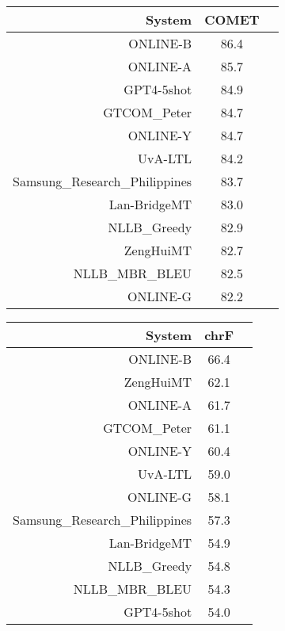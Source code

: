 \documentclass[11pt]{article}
\begin{document}
\begin{table}  
\scriptsize
\begin{subtable}[t]{0.33\textwidth}
\begin{tabular}{rcc}
\toprule 
System  & COMET \\ 
\midrule 
\rowcolor{ashgrey} ONLINE-B  & 86.4 \\ 
\rowcolor{ashgrey} ONLINE-A  & 85.7 \\ 
\rowcolor{ashgrey} GPT4-5shot  & 84.9 \\ 
\rowcolor{ashgrey} GTCOM\_Peter  & 84.7 \\ 
\rowcolor{ashgrey} ONLINE-Y  & 84.7 \\ 
UvA-LTL  & 84.2 \\ 
Samsung\_Research\_Philippines  & 83.7 \\ 
\rowcolor{ashgrey} Lan-BridgeMT  & 83.0 \\ 
\rowcolor{ashgrey} NLLB\_Greedy  & 82.9 \\ 
\rowcolor{ashgrey} ZengHuiMT & 82.7 \\ 
\rowcolor{ashgrey} NLLB\_MBR\_BLEU  & 82.5 \\ 
\rowcolor{ashgrey} ONLINE-G  & 82.2 \\ 
\bottomrule 
\end{tabular} 
\end{subtable} 
\begin{subtable}[t]{0.33\textwidth}
\begin{tabular}{rcc}
\toprule 
System  & chrF \\ 
\midrule 
\rowcolor{ashgrey} ONLINE-B  & 66.4 \\ 
\rowcolor{ashgrey} ZengHuiMT  & 62.1 \\ 
\rowcolor{ashgrey} ONLINE-A  & 61.7 \\ 
\rowcolor{ashgrey} GTCOM\_Peter  & 61.1 \\ 
\rowcolor{ashgrey} ONLINE-Y  & 60.4 \\ 
UvA-LTL  & 59.0 \\ 
\rowcolor{ashgrey} ONLINE-G  & 58.1 \\ 
Samsung\_Research\_Philippines  & 57.3 \\ 
\rowcolor{ashgrey} Lan-BridgeMT  & 54.9 \\ 
\rowcolor{ashgrey} NLLB\_Greedy  & 54.8 \\ 
\rowcolor{ashgrey} NLLB\_MBR\_BLEU  & 54.3 \\ 
\rowcolor{ashgrey} GPT4-5shot  & 54.0 \\ 
\bottomrule 

\end{tabular}
\end{subtable}
\end{table}
\end{document}
